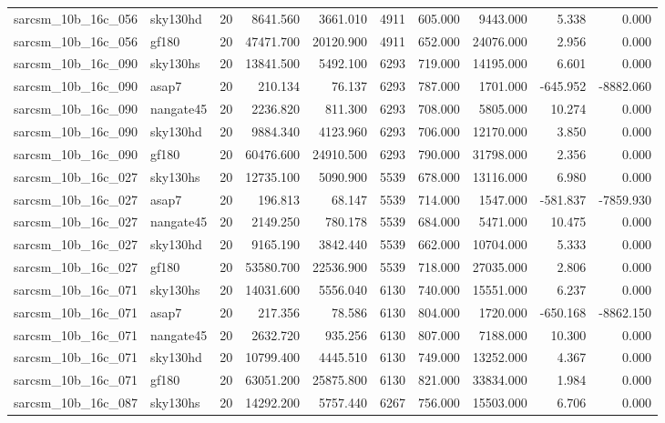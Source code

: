 \begin{tabular}{llrrrrrrrr}
sarcsm\_10b\_16c\_056 & sky130hd & 20 & 8641.560 & 3661.010 & 4911 & 605.000 & 9443.000 & 5.338 & 0.000 \\
sarcsm\_10b\_16c\_056 & gf180 & 20 & 47471.700 & 20120.900 & 4911 & 652.000 & 24076.000 & 2.956 & 0.000 \\
sarcsm\_10b\_16c\_090 & sky130hs & 20 & 13841.500 & 5492.100 & 6293 & 719.000 & 14195.000 & 6.601 & 0.000 \\
sarcsm\_10b\_16c\_090 & asap7 & 20 & 210.134 & 76.137 & 6293 & 787.000 & 1701.000 & -645.952 & -8882.060 \\
sarcsm\_10b\_16c\_090 & nangate45 & 20 & 2236.820 & 811.300 & 6293 & 708.000 & 5805.000 & 10.274 & 0.000 \\
sarcsm\_10b\_16c\_090 & sky130hd & 20 & 9884.340 & 4123.960 & 6293 & 706.000 & 12170.000 & 3.850 & 0.000 \\
sarcsm\_10b\_16c\_090 & gf180 & 20 & 60476.600 & 24910.500 & 6293 & 790.000 & 31798.000 & 2.356 & 0.000 \\
sarcsm\_10b\_16c\_027 & sky130hs & 20 & 12735.100 & 5090.900 & 5539 & 678.000 & 13116.000 & 6.980 & 0.000 \\
sarcsm\_10b\_16c\_027 & asap7 & 20 & 196.813 & 68.147 & 5539 & 714.000 & 1547.000 & -581.837 & -7859.930 \\
sarcsm\_10b\_16c\_027 & nangate45 & 20 & 2149.250 & 780.178 & 5539 & 684.000 & 5471.000 & 10.475 & 0.000 \\
sarcsm\_10b\_16c\_027 & sky130hd & 20 & 9165.190 & 3842.440 & 5539 & 662.000 & 10704.000 & 5.333 & 0.000 \\
sarcsm\_10b\_16c\_027 & gf180 & 20 & 53580.700 & 22536.900 & 5539 & 718.000 & 27035.000 & 2.806 & 0.000 \\
sarcsm\_10b\_16c\_071 & sky130hs & 20 & 14031.600 & 5556.040 & 6130 & 740.000 & 15551.000 & 6.237 & 0.000 \\
sarcsm\_10b\_16c\_071 & asap7 & 20 & 217.356 & 78.586 & 6130 & 804.000 & 1720.000 & -650.168 & -8862.150 \\
sarcsm\_10b\_16c\_071 & nangate45 & 20 & 2632.720 & 935.256 & 6130 & 807.000 & 7188.000 & 10.300 & 0.000 \\
sarcsm\_10b\_16c\_071 & sky130hd & 20 & 10799.400 & 4445.510 & 6130 & 749.000 & 13252.000 & 4.367 & 0.000 \\
sarcsm\_10b\_16c\_071 & gf180 & 20 & 63051.200 & 25875.800 & 6130 & 821.000 & 33834.000 & 1.984 & 0.000 \\
sarcsm\_10b\_16c\_087 & sky130hs & 20 & 14292.200 & 5757.440 & 6267 & 756.000 & 15503.000 & 6.706 & 0.000 \\

\end{tabular}

